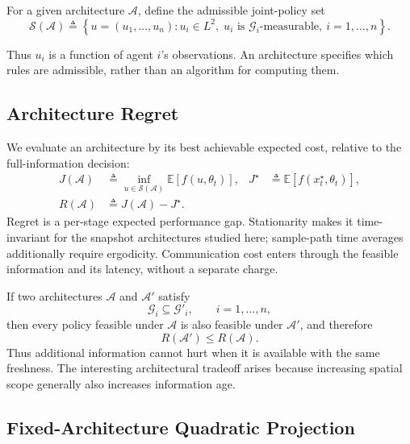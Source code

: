 \documentclass[11pt]{article}
\begin{document}
For a given architecture $\mathcal{A}$, define the admissible joint-policy set
\begin{equation}
    \mathcal{S}(\mathcal{A})
    \triangleq
    \left\{
        u=(u_1,\ldots,u_n):
        u_i\in L^2,\;
        u_i \text{ is }\mathcal{G}_i\text{-measurable},
        \ i=1,\ldots,n
    \right\}.
    \label{eq:policy_subspace}
\end{equation}

Thus $u_i$ is a function of agent $i$'s observations. An architecture specifies
which rules are admissible, rather than an algorithm for computing them.

\subsection{Architecture Regret}
\label{subsec:architecture_regret}

We evaluate an architecture by its best achievable expected cost, relative to
the full-information decision:
\begin{align}
J(\mathcal A)&\triangleq\inf_{u\in\mathcal S(\mathcal A)}\mathbb E[f(u,\theta_t)],
&J^\star&\triangleq\mathbb E[f(x_t^\star,\theta_t)],
\label{eq:architecture_cost}\\
R(\mathcal A)&\triangleq J(\mathcal A)-J^\star.
\label{eq:architecture_regret}
\end{align}
Regret is a per-stage expected performance gap. Stationarity makes it
time-invariant for the snapshot architectures studied here; sample-path
time averages additionally require ergodicity. Communication cost enters
through the feasible information and its latency, without a separate charge.

If two architectures $\mathcal{A}$ and $\mathcal{A}'$ satisfy
\begin{equation}
    \mathcal{G}_i
    \subseteq
    \mathcal{G}'_i,
    \qquad
    i=1,\ldots,n,
    \label{eq:info_inclusion}
\end{equation}
then every policy feasible under $\mathcal{A}$ is also feasible under
$\mathcal{A}'$, and therefore
\begin{equation}
    R(\mathcal{A}')
    \le
    R(\mathcal{A}).
    \label{eq:architecture_monotonicity}
\end{equation}
Thus additional information cannot hurt when it is available with the same
freshness. The interesting architectural tradeoff arises because increasing
spatial scope generally also increases information age.

\subsection{Fixed-Architecture Quadratic Projection}
\label{subsec:projection}
\end{document}

